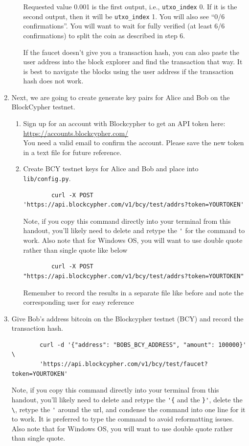 \documentclass[11pt]{article}
\begin{document}
\begin{enumerate}
\begin{enumerate}
Requested value 0.001 is the first output, i.e., \texttt{utxo\_index} 0. If it is the second output, then it will be \texttt{utxo\_index} 1. You will also see “0/6 confirmations”. You will want to wait for fully verified (at least 6/6 confirmations) to split the coin as described in step 6.

If the faucet doesn't give you a transaction hash, you can also paste the user address into the block explorer and find the transaction that way. It is best to navigate the blocks using the user address if the transaction hash does not work.
    \end{enumerate}
    \item Next, we are going to create generate key pairs for Alice and Bob on the BlockCypher testnet.
    \begin{enumerate}
		\item
			Sign up for an account with Blockcypher to get an API token here: \\
			\href{https://accounts.blockcypher.com/}{https://accounts.blockcypher.com/} \\
			You need a valid email to confirm the account. Please save the new token in a text file for future reference.
		\item
			Create BCY testnet keys for Alice and Bob and place into \texttt{lib/config.py}.
			\begin{verbatim}
  		curl -X POST 'https://api.blockcypher.com/v1/bcy/test/addrs?token=YOURTOKEN'
			\end{verbatim}
    		Note, if you copy this command directly into your terminal from this handout, you'll likely need to delete and retype the \verb|'| for the command to work. Also note that for Windows OS, you will want to use double quote rather than single quote like below

                       \begin{verbatim}
  		curl -X POST "https://api.blockcypher.com/v1/bcy/test/addrs?token=YOURTOKEN"
			\end{verbatim}
		Remember to record the results in a separate file like before and note the corresponding user for easy reference 

	\end{enumerate}
	\item
		Give Bob's address bitcoin on the Blockcypher testnet (BCY) and record the transaction hash.
		\begin{verbatim}
		curl -d '{"address": "BOBS_BCY_ADDRESS", "amount": 100000}' \
		'https://api.blockcypher.com/v1/bcy/test/faucet?token=YOURTOKEN'
		\end{verbatim}
		Note, if you copy this command directly into your terminal from this handout, you'll likely need to delete and retype the \verb|'{| and the \verb|}'|, delete the \verb|\|, retype the \verb|'| around the url, and condense the command into one line for it to work. It is preferred to type the command to avoid reformatting issues. Also note that for Windows OS, you will want to use double quote rather than single quote.


\end{enumerate}
\end{document}
